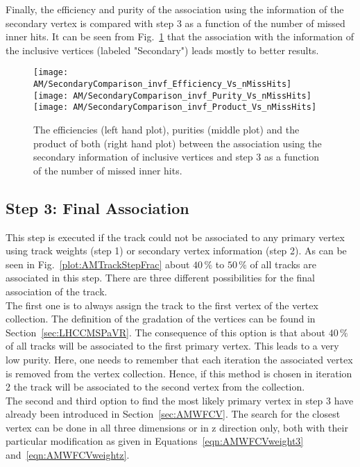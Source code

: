 Finally, the efficiency and purity of the association using the information of the secondary vertex is compared with step 3 as a function of the number of missed inner hits. It can be seen from Fig.~\ref{plot:AMWFSVinvfEffAndPurVsFA} that the association with the information of the inclusive vertices (labeled "Secondary") leads mostly to better results.

\begin{figure}[!ht]
    \centering
    \texttt{[image: AM/SecondaryComparison\_invf\_Efficiency\_Vs\_nMissHits]}
    \texttt{[image: AM/SecondaryComparison\_invf\_Purity\_Vs\_nMissHits]}
    \texttt{[image: AM/SecondaryComparison\_invf\_Product\_Vs\_nMissHits]}
    \caption[Efficiencies, purities and their product for the association with inclusive vertices vs final association as a function of missed inner hits]{The efficiencies (left hand plot), purities (middle plot) and the product of both (right hand plot) between the association using the secondary information of inclusive vertices and step 3 as a function of the number of missed inner hits.\label{plot:AMWFSVinvfEffAndPurVsFA}}
\end{figure}


\subsection{Step 3: Final Association\label{sec:AMWFFA}}

This step is executed if the track could not be associated to any primary vertex using track weights (step 1) or secondary vertex information (step 2). As can be seen in Fig.~\ref{plot:AMTrackStepFrac} about $40\,\%$ to $50\,\%$ of all tracks are associated in this step. There are three different possibilities for the final association of the track. \\
The first one is to always assign the track to the first vertex of the vertex collection. The definition of the gradation of the vertices can be found in Section~\ref{sec:LHCCMSPaVR}. The consequence of this option is that about $40\,\%$ of all tracks will be associated to the first primary vertex. This leads to a very low purity. Here, one needs to remember that each iteration the associated vertex is removed from the vertex collection. Hence, if this method is chosen in iteration 2 the track will be associated to the second vertex from the collection. \\
The second and third option to find the most likely primary vertex in step 3 have already been introduced in Section~\ref{sec:AMWFCV}. The search for the closest vertex can be done in all three dimensions or in z direction only, both with their particular modification as given in Equations~\ref{eqn:AMWFCVweight3} and~\ref{eqn:AMWFCVweightz}.

